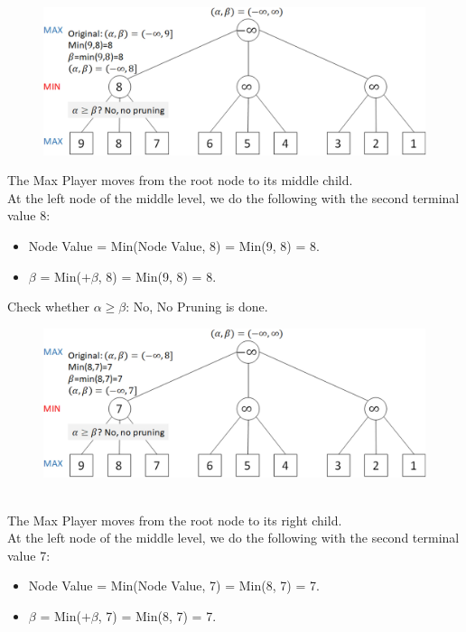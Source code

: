 \documentclass{book}
\begin{document}
\vspace{1.2cm}
\\
\begin{figure}
    \includegraphics[scale=0.09]{chapter 10/ch10_figure5.jpeg}
\end{figure}
The Max Player moves from the root node to its middle child.\\
At the left node of the middle level, we do the following with the second terminal value 8:
\begin{itemize}
    \item Node Value = Min(Node Value, 8) = Min(9, 8) = 8.
    \item $\beta$ = Min($+\beta$, 8) = Min(9, 8) = 8.
\end{itemize}
Check whether $\alpha \geq \beta$: No, No Pruning is done.\\
\newpage
\begin{figure}
    \includegraphics[scale=0.09]{chapter 10/ch10_figure6.jpeg}
\end{figure}
\\
The Max Player moves from the root node to its right child.\\
At the left node of the middle level, we do the following with the second terminal value 7:
\begin{itemize}
    \item Node Value = Min(Node Value, 7) = Min(8, 7) = 7.
    \item $\beta$ = Min($+\beta$, 7) = Min(8, 7) = 7.
\end{itemize}
\end{document}

